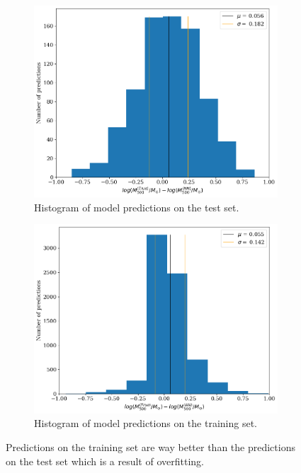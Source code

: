 \begin{figure}[H]
\begin{subfigure}{.46\textwidth}
  \centering
  \includegraphics[width=\linewidth]{images/Chapter4/Res101/res101_test_hist.png}
  \caption{Histogram of model predictions on the test set.}
  \label{fig:best_perf_resnet101_c}
\end{subfigure}%
\hspace{.6em}
\begin{subfigure}{.46\textwidth}
  \centering
  \includegraphics[width=\linewidth]{images/Chapter4/Res101/res101_train_hist.png}
  \caption{Histogram of model predictions on the training set.}
  \label{fig:best_perf_resnet101_d}
\end{subfigure}
\caption{Predictions on the training set are way better than the predictions on the test set which is a result of overfitting.} 
\label{fig:best_perf_resnet101}
\end{figure}

